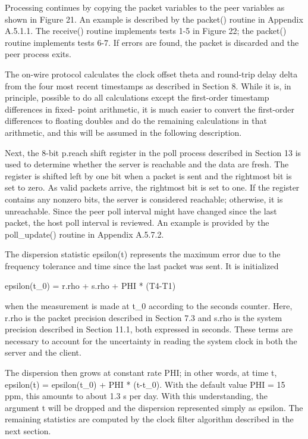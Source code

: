 Processing continues by copying the packet variables to the peer
variables as shown in Figure 21. An example is described by the
packet() routine in Appendix A.5.1.1. The receive() routine
implements tests 1-5 in Figure 22; the packet() routine implements
tests 6-7. If errors are found, the packet is discarded and the peer
process exits.

The on-wire protocol calculates the clock offset theta and round-trip
delay delta from the four most recent timestamps as described in
Section 8. While it is, in principle, possible to do all
calculations except the first-order timestamp differences in fixed-
point arithmetic, it is much easier to convert the first-order
differences to floating doubles and do the remaining calculations in
that arithmetic, and this will be assumed in the following
description.

Next, the 8-bit p.reach shift register in the poll process described
in Section 13 is used to determine whether the server is reachable
and the data are fresh. The register is shifted left by one bit when
a packet is sent and the rightmost bit is set to zero. As valid
packets arrive, the rightmost bit is set to one. If the register
contains any nonzero bits, the server is considered reachable;
otherwise, it is unreachable. Since the peer poll interval might
have changed since the last packet, the host poll interval is
reviewed. An example is provided by the poll\_update() routine in
Appendix A.5.7.2.

The dispersion statistic epsilon(t) represents the maximum error due
to the frequency tolerance and time since the last packet was sent.
It is initialized

epsilon(t\_0) = r.rho + s.rho + PHI * (T4-T1)

when the measurement is made at t\_0 according to the seconds counter.
Here, r.rho is the packet precision described in Section 7.3 and
s.rho is the system precision described in Section 11.1, both
expressed in seconds. These terms are necessary to account for the
uncertainty in reading the system clock in both the server and the
client.

The dispersion then grows at constant rate PHI; in other words, at
time t, epsilon(t) = epsilon(t\_0) + PHI * (t-t\_0). With the default
value PHI = 15 ppm, this amounts to about 1.3 s per day. With this
understanding, the argument t will be dropped and the dispersion
represented simply as epsilon. The remaining statistics are computed
by the clock filter algorithm described in the next section.
